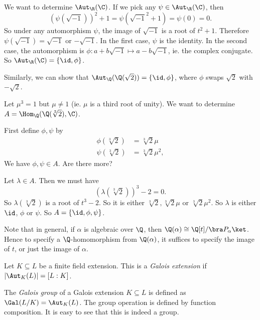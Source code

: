 \documentclass[a4paper]{article}
\begin{document}
\begin{eg}
  We want to determine $\Aut_\R(\C)$. If we pick any $\psi\in \Aut_\R(\C)$, then
  \[
    (\psi(\sqrt{-1}))^2 + 1 = \psi(\sqrt{-1}^2 + 1) = \psi(0) = 0.
  \]
  So under any automorphism $\psi$, the image of $\sqrt{-1}$ is a root of $t^2 + 1$. Therefore $\psi(\sqrt{-1}) = \sqrt{-1}$ or $-\sqrt{-1}$. In the first case, $\psi$ is the identity. In the second case, the automorphism is $\phi: a + b\sqrt{-1} \mapsto a - b\sqrt{-1}$, ie. the complex conjugate. So $\Aut_\R(\C) = \{\id, \phi\}$.

  Similarly, we can show that $\Aut_\Q(\Q(\sqrt{2})) = \{\id, \phi\}$, where $\phi$ swaps $\sqrt{2}$ with $-\sqrt{2}$.
\end{eg}

\begin{eg}
  Let $\mu^3 = 1$ but $\mu \not= 1$ (ie. $\mu$ is a third root of unity). We want to determine $A = \Hom_\Q(\Q(\sqrt[3]{2}), \C)$.

  First define $\phi, \psi$ by
  \begin{align*}
    \phi(\sqrt[3]{2}) &= \sqrt[3]{2}\mu\\
    \psi(\sqrt[3]{2}) &= \sqrt[3]{2}\mu^2,
  \end{align*}
  We have $\phi, \psi \in A$. Are there more?

  Let $\lambda \in A$. Then we must have
  \[
    (\lambda(\sqrt[3]{2}))^3 - 2 = 0.
  \]
  So $\lambda(\sqrt[3]{2})$ is a root of $t^3 - 2$. So it is either $\sqrt[3]{2}, \sqrt[3]{2}\mu$ or $\sqrt[3]{2}\mu^2$. So $\lambda$ is either $\id$, $\phi$ or $\psi$. So $A = \{\id, \phi, \psi\}$.
\end{eg}
Note that in general, if $\alpha$ is algebraic over $\Q$, then $\Q(\alpha) \cong \Q[t]/\bra P_\alpha\ket $. Hence to specify a $\Q$-homomorphism from $\Q(\alpha)$, it suffices to specify the image of $t$, or just the image of $\alpha$.

\begin{defi}
  Let $K\subseteq L$ be a finite field extension. This is a \emph{Galois extension} if $|\Aut_K(L)| = [L:K]$.
\end{defi}

\begin{defi}
  The \emph{Galois group} of a Galois extension $K\subseteq L$ is defined as $\Gal(L/K) = \Aut_K(L)$. The group operation is defined by function composition. It is easy to see that this is indeed a group.
\end{defi}
\end{document}
